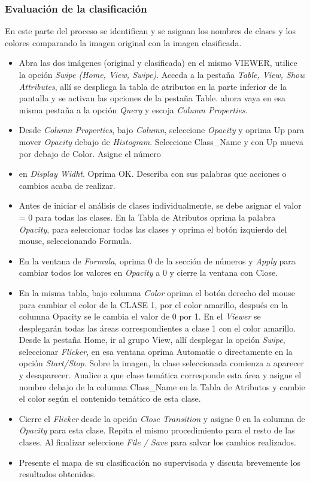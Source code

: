 \documentclass[a4paper,oneside,11pt,]{article}
\begin{document}
\subsubsection{Evaluación de la clasificación}
En este parte del proceso se identifican y se asignan  los nombres de clases y los colores comparando la imagen original con la imagen clasificada.
\begin{itemize}
\item Abra las dos imágenes (original y clasificada) en el mismo VIEWER, utilice la opción \emph{Swipe (Home, View, Swipe)}. Acceda a la pestaña \emph{Table, View, Show Attributes}, allí se despliega la tabla de atributos en la parte inferior de la pantalla y se activan las opciones de la pestaña Table. ahora vaya en esa misma pestaña a la opción \emph{Query} y escoja \emph{Column Properties}.
\item Desde \emph{Column Properties},  bajo \emph{Column},  seleccione \emph{Opacity} y oprima Up para mover \emph{Opacity} debajo de \emph{Histogram}.  Seleccione Class\_Name y con Up mueva por debajo de Color. Asigne el número 
\item en \emph{Display Widht}. Oprima OK. Describa con sus palabras que acciones o cambios acaba de realizar.
\item Antes de iniciar el análisis de clases individualmente, se debe asignar el valor = 0 para todas las clases. En la Tabla de Atributos oprima la palabra \emph{Opacity}, para seleccionar todas las clases y oprima el botón izquierdo del mouse, seleccionando Formula.
\item En la ventana de \emph{Formula}, oprima 0 de la sección de números y \emph{Apply} para cambiar todos los valores en \emph{Opacity} a 0 y cierre la ventana con Close. 
\item En la misma tabla, bajo columna \emph{Color} oprima el botón derecho del mouse para cambiar el color de la CLASE 1,  por el color amarillo, después en la columna Opacity se le cambia el valor de 0 por 1. En el \emph{Viewer} se desplegarán todas las áreas correspondientes a clase 1 con el color amarillo.  Desde la pestaña Home, ir al grupo View, allí desplegar la opción \emph{Swipe}, seleccionar \emph{Flicker}, en esa ventana oprima Automatic o directamente en la opción \emph{Start/Stop}.   Sobre la imagen,  la clase seleccionada comienza a aparecer y desaparecer. Analice a que clase temática corresponde esta área y asigne el nombre debajo de la columna Class\_Name en la Tabla de Atributos y cambie el color según el contenido temático de esta clase.
\item Cierre el \emph{Flicker} desde la opción \emph{Close Transition} y asigne 0 en la columna de \emph{Opacity} para esta clase. Repita el mismo procedimiento para el resto de las clases. Al finalizar seleccione \emph{File / Save} para salvar los cambios realizados.
\item Presente el mapa de su clasificación no supervisada y discuta brevemente los resultados obtenidos.
\end{itemize}
\end{document}
